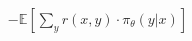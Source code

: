 \documentclass[preview]{standalone}
\begin{document}
\begin{align*}
-\mathbb{E}\left[\sum_{y} r(x, y)\cdot\pi_{\theta}(y|x)\right]
\end{align*}
\end{document}
